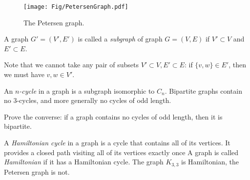 \begin{page}
\setcounter{section}{1}
\setcounter{subsection}{3}
\setcounter{dfn}{6}
\label{portion:161}


\begin{figure}[h]
\begin{center}
\texttt{[image: Fig/PetersenGraph.pdf]}
\end{center}
\caption{The Petersen graph.}
\label{fig:Petersen}
\end{figure}


\end{page}

\begin{page}
\setcounter{section}{1}
\setcounter{subsection}{3}
\setcounter{dfn}{7}
\label{portion:163}

\begin{dfn}
A graph $G' = (V', E')$ is called a \emph{subgraph} of graph $G = (V, E)$ if $V' \subset V$ and $E' \subset E$.
\end{dfn}

\end{page}

\begin{page}
\setcounter{section}{1}
\setcounter{subsection}{3}
\setcounter{dfn}{7}
\label{portion:164}

Note that we cannot take any pair of subsets $V' \subset V, E' \subset E$:
if $\{v, w\} \in E'$, then we must have $v, w \in V'$.

An \emph{$n$-cycle} in a graph is a subgraph isomorphic to $C_n$.
Bipartite graphs contain no $3$-cycles, and more generally no cycles of odd length.


\end{page}

\begin{page}
\setcounter{section}{1}
\setcounter{subsection}{3}
\setcounter{dfn}{8}
\label{portion:166}

\begin{exc}
Prove the converse: if a graph contains no cycles of odd length, then it is bipartite.
\end{exc}

\end{page}

\begin{page}
\setcounter{section}{1}
\setcounter{subsection}{4}
\setcounter{dfn}{8}
\label{portion:167}


A \emph{Hamiltonian cycle} in a graph is a cycle that contains all of its vertices.
It provides a closed path visiting all of its vertices exactly once
A graph is called \emph{Hamiltonian} if it has a Hamiltonian cycle.
The graph $K_{3,3}$ is Hamiltonian, the Petersen graph is not.




\end{page}

